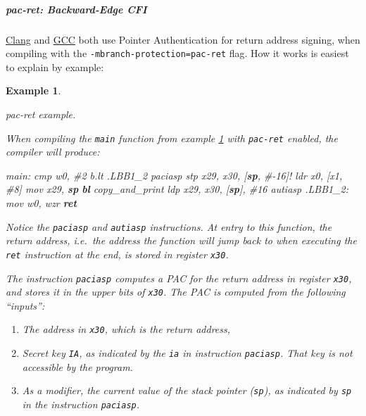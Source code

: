 \documentclass[
  a4paper,
]{report}
\newtheorem{example}{Example}
\newenvironment{Shaded}{}{}
\newcommand{\CommentTok}[1]{\textcolor[rgb]{0.38,0.63,0.69}{\textit{#1}}}
\newcommand{\FunctionTok}[1]{\textcolor[rgb]{0.02,0.16,0.49}{#1}}
\newcommand{\KeywordTok}[1]{\textcolor[rgb]{0.00,0.44,0.13}{\textbf{#1}}}
\newcommand{\NormalTok}[1]{#1}
\newcommand{\OperatorTok}[1]{\textcolor[rgb]{0.40,0.40,0.40}{#1}}
\providecommand{\tightlist}{%
  \setlength{\itemsep}{0pt}\setlength{\parskip}{0pt}}
\begin{document}
\subparagraph{pac-ret: Backward-Edge CFI}\label{sec:pac-ret}

\href{https://clang.llvm.org/docs/ClangCommandLineReference.html\#aarch64}{Clang}
and \href{https://gcc.gnu.org/onlinedocs/gcc/AArch64-Options.html}{GCC}
both use Pointer Authentication for return address signing, when
compiling with the \texttt{-mbranch-protection=pac-ret} flag. How it
works is easiest to explain by example:

\label{ex:pac-ret}
\begin{example}

\label{ex:pac-ret}

\textup{pac-ret example.}

When compiling the \texttt{main} function from example
\hyperref[ex:stack-buffer-overflow]{1} with \texttt{pac-ret} enabled,
the compiler will produce:

\begin{Shaded}
\begin{Highlighting}[]
\FunctionTok{main:}
\NormalTok{    cmp     w0}\OperatorTok{,} \CommentTok{\#2}
\NormalTok{    b.lt    .LBB1\_2}
\NormalTok{    paciasp}
\NormalTok{    stp     x29}\OperatorTok{,}\NormalTok{ x30}\OperatorTok{,} \OperatorTok{[}\KeywordTok{sp}\OperatorTok{,} \CommentTok{\#{-}16]!}
\NormalTok{    ldr     x0}\OperatorTok{,} \OperatorTok{[}\NormalTok{x1}\OperatorTok{,} \CommentTok{\#8]}
\NormalTok{    mov     x29}\OperatorTok{,} \KeywordTok{sp}
    \KeywordTok{bl}\NormalTok{      copy\_and\_print}
\NormalTok{    ldp     x29}\OperatorTok{,}\NormalTok{ x30}\OperatorTok{,} \OperatorTok{[}\KeywordTok{sp}\OperatorTok{],} \CommentTok{\#16}
\NormalTok{    autiasp}
\FunctionTok{.LBB1\_2:}
\NormalTok{    mov     w0}\OperatorTok{,}\NormalTok{ wzr}
    \KeywordTok{ret}
\end{Highlighting}
\end{Shaded}

Notice the \texttt{paciasp} and \texttt{autiasp} instructions. At entry
to this function, the return address, i.e.~the address the function will
jump back to when executing the \texttt{ret} instruction at the end, is
stored in register \texttt{x30}.

The instruction \texttt{paciasp} computes a PAC for the return address
in register \texttt{x30}, and stores it in the upper bits of
\texttt{x30}. The PAC is computed from the following ``inputs'':

\begin{enumerate}
\def\labelenumi{\arabic{enumi}.}
\tightlist
\item
  The address in \texttt{x30}, which is the return address,
\item
  Secret key \texttt{IA}, as indicated by the \texttt{ia} in instruction
  \texttt{paciasp}. That key is not accessible by the program.
\item
  As a modifier, the current value of the stack pointer (\texttt{sp}),
  as indicated by \texttt{sp} in the instruction \texttt{paciasp}.
\end{enumerate}


\end{example}
\end{document}
